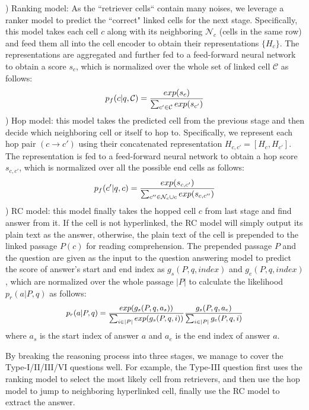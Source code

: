 \documentclass[11pt,a4paper]{article}
\begin{document}
\vspace{2ex}
) Ranking model: As the ``retriever cells`` contain many noises, we leverage a ranker model to predict the ``correct" linked cells for the next stage. Specifically, this model takes each cell $c$ along with its neighboring $\mathcal{N}_c$ (cells in the same row) and feed them all into the cell encoder to obtain their representations $\{H_c\}$. The representations are aggregated and  further fed to a feed-forward neural network to obtain a score $s_c$, which is normalized over the whole set of linked cell $\mathcal{C}$ as follows:
\begin{equation}
\small
p_{f}(c|q, \mathcal{C}) = \frac{exp(s_c)}{\sum_{c' \in \mathcal{C}} exp(s_{c'})}
\end{equation}
) Hop model: this model takes the predicted cell from the previous stage and then decide which neighboring cell or itself to hop to. Specifically, we represent each hop pair $(c \rightarrow c')$ using their concatenated representation $H_{c, c'}=[H_c, H_{c'}]$. The representation is fed to a feed-forward neural network to obtain a hop score $s_{c, c'}$, which is normalized over all the possible end cells as follows:
\begin{equation}
\small
p_{f}(c'|q, c) = \frac{exp(s_{c, c'})}{\sum_{c'' \in \mathcal{N}_c \cup c} exp(s_{c, c''})}
\end{equation}
) RC model: this model finally takes the hopped cell $c$ from last stage and find answer from it. If the cell is not hyperlinked, the RC model will simply output its plain text as the answer, otherwise, the plain text of the cell is prepended to the linked passage $P(c)$ for reading comprehension. The prepended passage $P$ and the question are given as the input to the question answering model to predict the score of answer's start and end index as $g_s(P, q, index)$ and $g_e(P, q, index)$, which are normalized over the whole passage $|P|$ to calculate the likelihood $p_{r}(a|P, q)$ as follows:
\begin{align*}
\small
\begin{split}
    p_{r}(a|P, q) = \frac{exp(g_s(P, q, a_s))}{\sum_{i \in |P|} exp(g_s(P, q, i))} \frac{g_s(P, q, a_e)}{\sum_{i \in |P|} g_e(P, q, i)}
\end{split}
\end{align*}
where $a_s$ is the start index of answer $a$ and $a_e$ is the end index of answer $a$.

By breaking the reasoning process into three stages, we manage to cover the Type-I/II/III/VI questions well. For example, the Type-III question first uses the ranking model to select the most likely cell from retrievers, and then use the hop model to jump to neighboring hyperlinked cell, finally use the RC model to extract the answer.   
\end{document}

